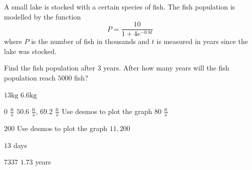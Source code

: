\begin{Exercise}[title={Modelling},label=exModelling]
\Question A small lake is stocked with a certain species of fish. The fish population is modelled by the function
\begin{equation*}P =\frac{10}{1 +4 e^{ -0.8 t}}
\end{equation*} where $P$ is the number of fish in thousands and $t$ is measured in years since the lake was stocked. 
\begin{tasks}
\task Find the fish population after $3$ years. %
\task After how many years will the fish population reach $5000$ fish? %
\end{tasks}
\end{Exercise}
\begin{Answer}[ref={exModelling}]
\Question %
\begin{tasks}
	\task $13 \mbox{kg}$
	\task $6.6 \mbox{kg}$ 
\end{tasks}

\Question %
\begin{tasks}
	\task $0$ $\frac{\text{ft}}{\text{s}}$
	\task $50.6$  $\frac{\text{ft}}{\text{s}}$, $69.2$ $\frac{\text{ft}}{\text{s}}$
	\task Use desmos to plot the graph
	\task $80$ $\frac{\text{ft}}{\text{s}}$
\end{tasks}

\Question %
\begin{tasks}
	\task $200$
	\task Use desmos to plot the graph
	\task $11,200$
\end{tasks}

\Question %
$13$ days

\Question %
\begin{tasks}
	\task $7337$
	\task $1.73$ years 
\end{tasks}
\end{Answer}%

